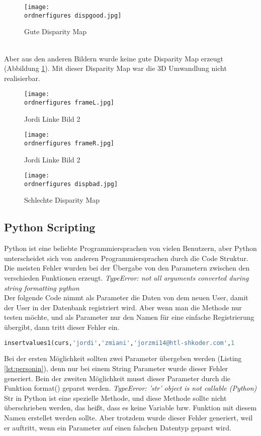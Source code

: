 \begin{figure}[!htb]
  \centering
    \texttt{[image: \\ordnerfigures dispgood.jpg]}
      \caption{Gute Disparity Map}
\end{figure}\\
Aber aus den anderen Bildern wurde keine gute Disparity Map erzeugt (Abbildung \ref{fig:baddm}). Mit dieser Disparity Map war die 3D Umwandlung nicht realisierbar.
\begin{figure}[!htb]
   \begin{minipage}{0.48\textwidth}
     \centering
     \texttt{[image: \\ordnerfigures frameL.jpg]}
     \caption{Jordi Linke Bild 2}
   \end{minipage}\hfill
   \begin{minipage}{0.48\textwidth}
     \centering
     \texttt{[image: \\ordnerfigures frameR.jpg]}
     \caption{Jordi Linke Bild 2}
   \end{minipage}
\end{figure}
\begin{figure}[!htb]
  \centering
    \texttt{[image: \\ordnerfigures dispbad.jpg]}
      \caption{Schlechte Disparity Map}
      \label{fig:baddm}
\end{figure}
\newpage
\subsection{Python Scripting}
Python ist eine beliebte Programmiersprachen von vielen Benutzern, aber Python unterscheidet sich von anderen Programmiersprachen durch die Code Struktur. Die meisten Fehler wurden bei der Übergabe von den Parametern zwischen den verschieden Funktionen erzeugt.
\bigbreak
\textit{TypeError: not all arguments converted during string formatting python}\\
Der folgende Code nimmt als Parameter die Daten von dem neuen User, damit der User in der Datenbank registriert wird. Aber wenn man die Methode nur testen möchte, und als Parameter nur den Namen für eine einfache Registrierung übergibt, dann tritt dieser Fehler ein.
\begin{lstlisting}[language=Python, label={lst:personin}, caption={Insert Person}]
insertvalues1(curs,'jordi','zmiani','jorzmi14@htl-shkoder.com',1
\end{lstlisting}
Bei der ersten Möglichkeit sollten zwei Parameter übergeben werden (Listing \ref{lst:personin}), denn nur bei einem String Parameter wurde dieser Fehler generiert.
Bein der zweiten Möglichkeit musst dieser Parameter durch die Funktion format()  geparst werden.
\bigbreak
\textit{TypeError: 'str' object is not callable (Python)}\\
Str in Python ist eine spezielle Methode, und diese Methode sollte nicht überschrieben werden, das heißt, dass es keine Variable bzw. Funktion mit diesem Namen erstellet werden  sollte. Aber trotzdem wurde dieser Fehler generiert, weil er auftritt, wenn ein Parameter auf einen falschen Datentyp geparst wird.


